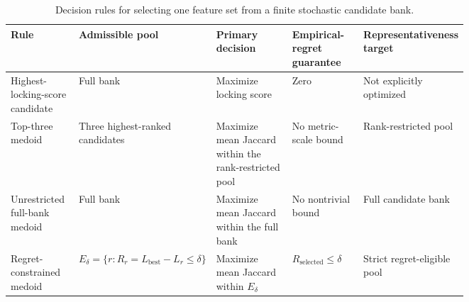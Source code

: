 \begin{table}[!htbp]
\centering
\caption{Decision rules for selecting one feature set from a finite stochastic candidate bank.}
\label{tab:locking-rule-distinction}
\footnotesize
\renewcommand{\arraystretch}{1.12}
\setlength{\tabcolsep}{3pt}
\begin{tabularx}{\linewidth}{@{}>{\raggedright\arraybackslash}p{0.16\linewidth}>{\raggedright\arraybackslash}p{0.18\linewidth}>{\raggedright\arraybackslash}p{0.23\linewidth}>{\raggedright\arraybackslash}p{0.18\linewidth}>{\raggedright\arraybackslash}X@{}}
\toprule
\bfseries Rule & \bfseries Admissible pool & \bfseries Primary decision & \bfseries Empirical-regret guarantee & \bfseries Representativeness target \\
\midrule
Highest-locking-score candidate & Full bank & Maximize locking score & Zero & Not explicitly optimized \\
Top-three medoid & Three highest-ranked candidates & Maximize mean Jaccard within the rank-restricted pool & No metric-scale bound & Rank-restricted pool \\
Unrestricted full-bank medoid & Full bank & Maximize mean Jaccard within the full bank & No nontrivial bound & Full candidate bank \\
Regret-constrained medoid & $E_{\delta}=\{r:R_r=L_{\mathrm{best}}-L_r\leq\delta\}$ & Maximize mean Jaccard within $E_{\delta}$ & $R_{\mathrm{selected}}\leq\delta$ & Strict regret-eligible pool \\
\bottomrule
\end{tabularx}
\end{table}
